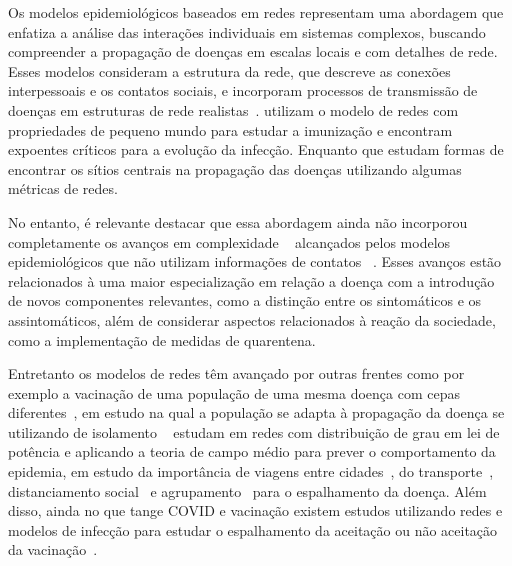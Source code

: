 Os modelos epidemiológicos baseados em redes representam uma abordagem que enfatiza a análise das interações individuais em sistemas complexos, buscando compreender a propagação de doenças em escalas locais e com detalhes de rede. Esses modelos consideram a estrutura da rede, que descreve as conexões interpessoais e os contatos sociais, e incorporam processos de transmissão de doenças em estruturas de rede realistas~\cite{Pei2023}.  utilizam o modelo de redes com propriedades de pequeno mundo para estudar a imunização e encontram expoentes críticos para a evolução da infecção. Enquanto que  estudam formas de encontrar os sítios centrais na propagação das doenças utilizando algumas métricas de redes.


No entanto, é relevante destacar que essa abordagem ainda não incorporou completamente os avanços em complexidade ~\cite{Eikenberry2020} alcançados pelos modelos epidemiológicos 
que não utilizam informações de contatos ~\cite{Pellis2015}. Esses avanços estão relacionados à uma maior especialização em relação a doença com a introdução de novos componentes relevantes, como a distinção entre os sintomáticos e os assintomáticos, além de considerar aspectos relacionados à reação da sociedade, como a implementação de medidas de quarentena.

Entretanto os modelos de redes têm avançado por outras frentes como por exemplo a vacinação de uma população de uma mesma doença com cepas diferentes~\cite{Li2023}, em estudo na qual a população se adapta à propagação da doença se utilizando de isolamento ~ estudam em redes com distribuição de grau em lei de potência e aplicando a teoria de campo médio para prever o comportamento da epidemia, em estudo da importância de viagens entre cidades~\cite{Quiroga2023,DellaRossa2020}, do transporte~\cite{Scabini2021}, distanciamento social~\cite{Maheshwari2020} e agrupamento~\cite{Craig2020} para o espalhamento da doença. Além disso, ainda no que tange COVID e vacinação existem estudos utilizando redes e modelos de infecção para estudar o espalhamento da aceitação ou não aceitação da vacinação~\cite{n_vacina}.

